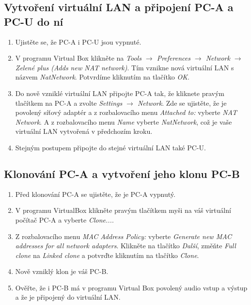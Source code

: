 \subsection{Vytvoření virtuální LAN a připojení PC-A a PC-U do ní}
\begin{enumerate}
  \item Ujistěte se, že PC-A i PC-U jsou vypnuté.
  \item V programu Virtual Box klikněte na \emph{Tools $\rightarrow$ Preferences $\rightarrow$ Network $\rightarrow$ Zelené plus (Adds new NAT network)}. Tím vznikne nová virtuální LAN s názvem \emph{NatNetwork}. Potvrdíme kliknutím na tlačítko \emph{OK}.
  \item Do nově vzniklé virtuální LAN připojte PC-A tak, že kliknete pravým tlačítkem na PC-A a zvolte \emph{Settings $\rightarrow$ Network}. Zde se ujistěte, že je povolený síťový adaptér a z rozbalovacího menu \emph{Attached to:} vyberte \emph{NAT Network}. A z rozbalovacího menu \emph{Name} vyberte \emph{NatNetwork}, což je vaše virtuální LAN vytvořená v předchozím kroku.
  \item Stejným postupem připojte do stejné virtuální LAN také PC-U.
\end{enumerate}


\subsection{Klonování PC-A a vytvoření jeho klonu PC-B}
\begin{enumerate}
	\item Před klonování PC-A se ujistěte, že je PC-A vypnutý.
	\item V programu VirtualBox klikněte pravým tlačítkem myši na váš virtuální počítač PC-A a vyberte \emph{Clone...}.
	\item Z rozbalovacího menu \emph{MAC Address Policy:} vyberte \emph{Generate new MAC addresses for all network adapters}. Klikněte na tlačítko \emph{Další}, změňte \emph{Full clone} na \emph{Linked clone} a potvrďte kliknutím na tlačítko \emph{Clone}.
	\item Nově vzniklý klon je váš PC-B.
	\item Ověřte, že i PC-B má v programu Virtual Box povolený audio vstup a výstup a že je připojený do virtuální LAN.
\end{enumerate}


